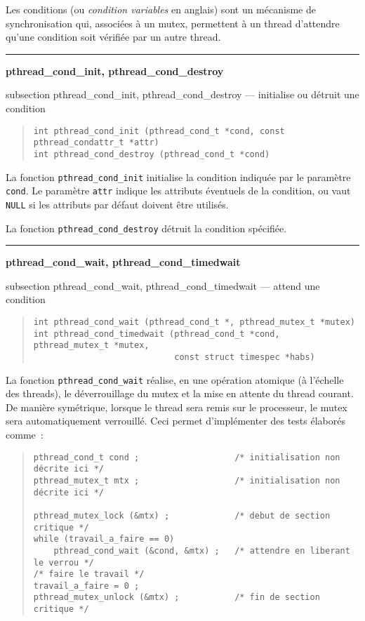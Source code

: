\documentclass [twoside] {report}
\newcommand {\primitive} [1]
    {
	{\large \bf #1}
	\addcontentsline {toc} {subsection} {#1}
    }
\newcommand {\separation}
    {
	\vspace {7mm}
	\nopagebreak
	\hrule
    }
\begin{document}
Les conditions (ou \textit {condition variables} en anglais) sont un
mécanisme de synchronisation qui, associées à un mutex, permettent à
un thread d'attendre qu'une condition soit vérifiée par un autre thread.


\separation
\primitive {pthread\_cond\_init, pthread\_cond\_destroy} --- initialise ou détruit une condition

\begin {quote}
\begin {verbatim}
int pthread_cond_init (pthread_cond_t *cond, const pthread_condattr_t *attr)
int pthread_cond_destroy (pthread_cond_t *cond)
\end{verbatim}
\end {quote}

La fonction \verb|pthread_cond_init| initialise la condition indiquée
par le paramètre \texttt {cond}.  Le paramètre \texttt {attr} indique
les attributs éventuels de la condition, ou vaut \texttt {NULL} si les
attributs par défaut doivent être utilisés.

La fonction \verb|pthread_cond_destroy| détruit la condition spécifiée.


\separation
\primitive {pthread\_cond\_wait, pthread\_cond\_timedwait} --- attend une condition

\begin {quote}
\begin {verbatim}
int pthread_cond_wait (pthread_cond_t *, pthread_mutex_t *mutex)
int pthread_cond_timedwait (pthread_cond_t *cond, pthread_mutex_t *mutex,
                            const struct timespec *habs)
\end{verbatim}
\end {quote}

La fonction \verb|pthread_cond_wait| réalise, en une opération atomique
(à l'échelle des threads), le déverrouillage du mutex et la mise en
attente du thread courant. De manière symétrique, lorsque le thread
sera remis sur le processeur, le mutex sera automatiquement verrouillé.
Ceci permet d'implémenter des tests élaborés comme~:

\begin {quote}
\small
\begin {verbatim}
pthread_cond_t cond ;                   /* initialisation non décrite ici */
pthread_mutex_t mtx ;                   /* initialisation non décrite ici */

pthread_mutex_lock (&mtx) ;             /* debut de section critique */
while (travail_a_faire == 0)
    pthread_cond_wait (&cond, &mtx) ;   /* attendre en liberant le verrou */
/* faire le travail */
travail_a_faire = 0 ;
pthread_mutex_unlock (&mtx) ;           /* fin de section critique */
\end{verbatim}
\end {quote}
\end{document}
